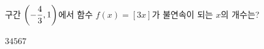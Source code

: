 구간 $\left(-\dfrac{4}{3}{,}\mkern3mu\mathopen{}1\right)$에서 함수 $f(x)=[3x]$가 불연속이 되는 $x$의 개수는? 
\begin{choices32}{$3$}{$4$}{$5$}{$6$}{$7$}\end{choices32}
